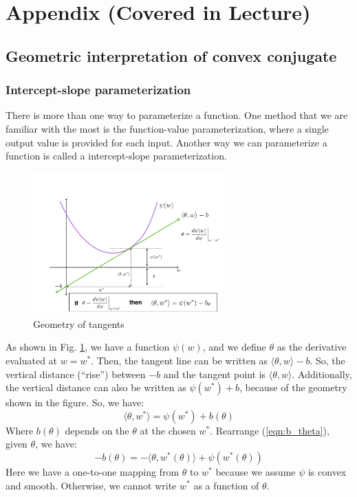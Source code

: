 \documentclass[11pt]{article}
\begin{document}
\newpage
\section{Appendix (Covered in Lecture)}
\subsection{Geometric interpretation of convex conjugate}
\label{sec:convex_conjugate_geometric}

\subsubsection{Intercept-slope parameterization}
There is more than one way to parameterize a function. One method that we are familiar with the most is the function-value parameterization, where a single output value is provided for each input. Another way we can parameterize a function is called a intercept-slope parameterization.

\begin{figure}[h]
    \centering
    \includegraphics[width=0.65\textwidth]{figures/intercept_slope.pdf}
    \caption{Geometry of tangents}
    \label{fig:geo_tangents}
\end{figure}

As shown in Fig. \ref{fig:geo_tangents}, we have a function $\psi(w)$, and we define $\theta$ as the derivative evaluated at $w = w^*$. Then, the tangent line can be written as $\langle \theta, w \rangle - b$. So, the vertical distance (``rise'') between $-b$ and the tangent point is $\langle \theta, w \rangle$. Additionally, the vertical distance can also be written as $\psi(w^*) + b$, because of the geometry shown in the figure. So, we have:
\begin{equation}
    \langle \theta, w^* \rangle = \psi(w^*) + b(\theta)
    \label{eqn:b_theta}
\end{equation}
Where $b(\theta)$ depends on the $\theta$ at the chosen $w^*$. Rearrange (\ref{eqn:b_theta}), given $\theta$, we have:
\begin{equation}
    -b(\theta) = - \langle \theta, w^*(\theta) \rangle
    + \psi(w^*(\theta))
\end{equation}
Here we have a one-to-one mapping from $\theta$ to $w^*$ because we assume $\psi$ is convex and smooth. Otherwise, we cannot write $w^*$ as a function of $\theta$.
\end{document}
